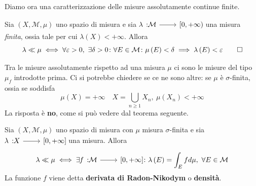 Diamo ora una caratterizzazione delle misure assolutamente continue finite.
\begin{theoremaqed}
Sia $\left(X,\mathcal{M},\mu\right)$ uno spazio di misura e sia $\funz{\lambda}{\mathcal{M}}{\left[0,+\infty\right)}$ una misura \textit{finita}, ossia tale per cui $\lambda(X)<+\infty$.
Allora
\begin{equation}
	\lambda\ll\mu\iff\forall \epsilon>0,\ \exists\delta>0\colon\forall E\in\mathcal{M}\colon \mu\left(E\right)<\delta\implies \lambda\left(E\right)<\epsilon\qedhere
\end{equation}
\end{theoremaqed}
Tra le misure assolutamente rispetto ad una misura $\mu$ ci sono le misure del tipo $\mu_f$ introdotte prima. Ci si potrebbe chiedere se ce ne sono altre: se $\mu$ è $\sigma$-finita, ossia se soddisfa
\begin{equation*}
	\mu(X)=+\infty\quad X=\bigcup_{n\geq 1}X_n,\ \mu\left(X_n\right)<+\infty
\end{equation*}
La risposta è \textbf{no}, come si può vedere dal teorema seguente.
\begin{theoremaqed}
	Sia $\left(X,\mathcal{M},\mu\right)$ uno spazio di misura con $\mu$ misura $\sigma$-finita e sia $\funz{\lambda}{X}{\left[0,+\infty\right]}$ una misura. Allora
	\begin{equation}
		\lambda\ll\mu\iff \exists \funz{f}{\mathcal{M}}{\left[0,+\infty\right]}\colon\lambda\left(E\right)=\int_Efd\mu,\ \forall E\in\mathcal{M}
	\end{equation}
La funzione $f$ viene detta \textbf{derivata di Radon-Nikodym} o \textbf{densità}.
\end{theoremaqed}
